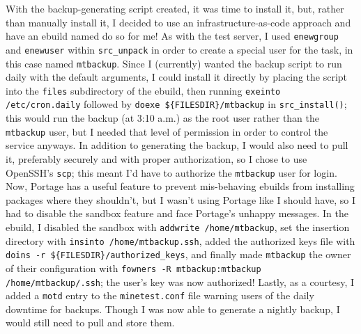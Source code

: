 \documentclass{article}
\begin{document}
With the backup-generating script created, it was time to install it, but, rather than manually install it, I decided to use an infrastructure-as-code approach and have an ebuild named  do so for me!  As with the test server, I used \texttt{enewgroup} and \texttt{enewuser} within \texttt{src_unpack} in order to create a special user for the task, in this case named \texttt{mtbackup}.  Since I (currently) wanted the backup script to run daily with the default arguments, I could install it directly by placing the script into the \texttt{files} subdirectory of the ebuild, then running \texttt{exeinto /etc/cron.daily} followed by \verb|doexe ${FILESDIR}/mtbackup| in \texttt{src_install()}; this would run the backup (at 3:10 a.m.) as the root user rather than the \texttt{mtbackup} user, but I needed that level of permission in order to control the service anyways.  In addition to generating the backup, I would also need to pull it, preferably securely and with proper authorization, so I chose to use OpenSSH's \texttt{scp}; this meant I'd have to authorize the \texttt{mtbackup} user for login.  Now, Portage has a useful  feature to prevent mis-behaving ebuilds from installing packages where they shouldn't, but I wasn't using Portage like I should have, so I had to disable the sandbox feature and face Portage's unhappy messages.  In the ebuild, I disabled the sandbox with \texttt{addwrite /home/mtbackup}, set the insertion directory with \texttt{insinto /home/mtbackup.ssh}, added the authorized keys file with \verb|doins -r ${FILESDIR}/authorized_keys|, and finally made \texttt{mtbackup} the owner of their configuration with \texttt{fowners -R mtbackup:mtbackup /home/mtbackup/.ssh}; the user's key was now authorized!  Lastly, as a courtesy, I added a \texttt{motd} entry to the \texttt{minetest.conf} file warning users of the daily downtime for backups.  Though I was now able to generate a nightly backup, I would still need to pull and store them.
\end{document}
